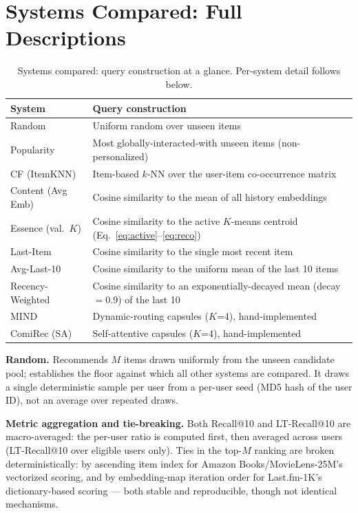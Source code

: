 \documentclass{article}
\begin{document}
\section{Systems Compared: Full Descriptions}
\label{app:systems}

\begin{table}[h]
\centering
\caption{Systems compared: query construction at a glance. Per-system detail follows below.}
\label{tab:systems}
\small
\begin{tabular}{ll}
\toprule
\textbf{System} & \textbf{Query construction} \\
\midrule
Random & Uniform random over unseen items \\
Popularity & Most globally-interacted-with unseen items (non-personalized) \\
CF (ItemKNN) & Item-based $k$-NN over the user-item co-occurrence matrix \\
Content (Avg Emb) & Cosine similarity to the mean of all history embeddings \\
Essence (val.\ $K$) & Cosine similarity to the active $K$-means centroid (Eq.~\ref{eq:active}--\ref{eq:reco}) \\
Last-Item & Cosine similarity to the single most recent item \\
Avg-Last-10 & Cosine similarity to the uniform mean of the last 10 items \\
Recency-Weighted & Cosine similarity to an exponentially-decayed mean (decay $=0.9$) of the last 10 \\
MIND & Dynamic-routing capsules ($K$=4), hand-implemented~\cite{li2019} \\
ComiRec (SA) & Self-attentive capsules ($K$=4), hand-implemented~\cite{cen2020} \\
\bottomrule
\end{tabular}
\end{table}


\textbf{Random.} Recommends $M$ items drawn uniformly from the unseen candidate pool; establishes the floor against which all other systems are compared. It draws a single deterministic sample per user from a per-user seed (MD5 hash of the user ID), not an average over repeated draws.

\textbf{Metric aggregation and tie-breaking.} Both Recall@10 and LT-Recall@10 are macro-averaged: the per-user ratio is computed first, then averaged across users (LT-Recall@10 over eligible users only). Ties in the top-$M$ ranking are broken deterministically: by ascending item index for Amazon Books/MovieLens-25M's vectorized scoring, and by embedding-map iteration order for Last.fm-1K's dictionary-based scoring --- both stable and reproducible, though not identical mechanisms.
\end{document}
